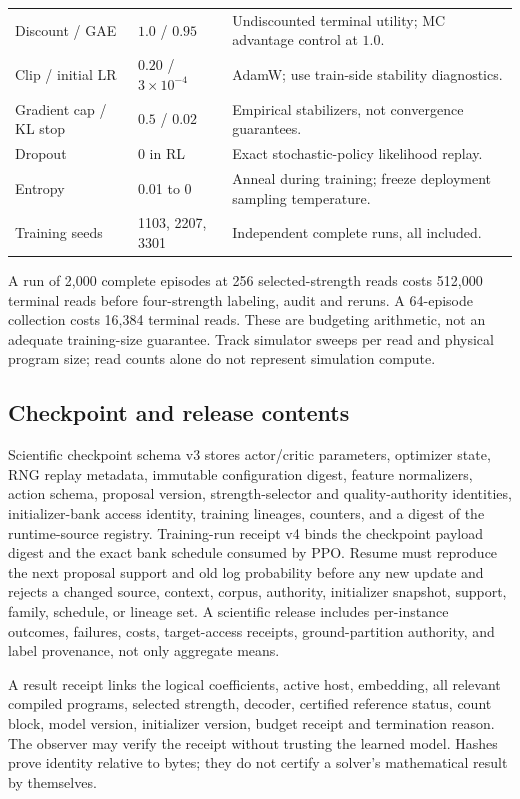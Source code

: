 \documentclass[11pt,a4paper]{article}
\theoremstyle{definition}\newtheorem{definition}[proposition]{Definition}
\begin{document}
{\begin{longtable}{@{}P{.30\textwidth}P{.20\textwidth}P{.43\textwidth}@{}}
Discount / GAE & $1.0$ / $0.95$ & Undiscounted terminal utility; MC advantage control at $1.0$.\\
Clip / initial LR & $0.20$ / $3\times10^{-4}$ & AdamW; use train-side stability diagnostics.\\
Gradient cap / KL stop & $0.5$ / $0.02$ & Empirical stabilizers, not convergence guarantees.\\
Dropout & 0 in RL & Exact stochastic-policy likelihood replay.\\
Entropy & 0.01 to 0 & Anneal during training; freeze deployment sampling temperature.\\
Training seeds & 1103, 2207, 3301 & Independent complete runs, all included.\\
\bottomrule\end{longtable}}

A run of 2,000 complete episodes at 256 selected-strength reads costs 512,000 terminal reads before four-strength labeling, audit and reruns. A 64-episode collection costs 16,384 terminal reads. These are budgeting arithmetic, not an adequate training-size guarantee. Track simulator sweeps per read and physical program size; read counts alone do not represent simulation compute.

\subsection{Checkpoint and release contents}
Scientific checkpoint schema v3 stores actor/critic parameters, optimizer state, RNG replay metadata, immutable configuration digest, feature normalizers, action schema, proposal version, strength-selector and quality-authority identities, initializer-bank access identity, training lineages, counters, and a digest of the runtime-source registry. Training-run receipt v4 binds the checkpoint payload digest and the exact bank schedule consumed by PPO. Resume must reproduce the next proposal support and old log probability before any new update and rejects a changed source, context, corpus, authority, initializer snapshot, support, family, schedule, or lineage set. A scientific release includes per-instance outcomes, failures, costs, target-access receipts, ground-partition authority, and label provenance, not only aggregate means.

A result receipt links the logical coefficients, active host, embedding, all relevant compiled programs, selected strength, decoder, certified reference status, count block, model version, initializer version, budget receipt and termination reason. The observer may verify the receipt without trusting the learned model. Hashes prove identity relative to bytes; they do not certify a solver's mathematical result by themselves.
\end{document}
